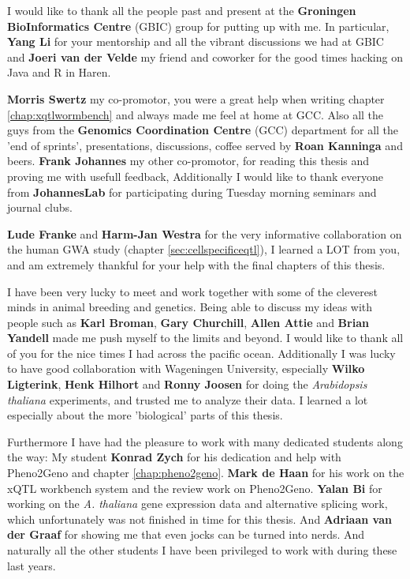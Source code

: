 I would like to thank all the people past and present at the {\bf Groningen BioInformatics Centre} 
(GBIC) group for putting up with me. In particular, {\bf Yang Li} for your mentorship and all the 
vibrant discussions we had at GBIC and {\bf Joeri van der Velde} my friend and coworker for the 
good times hacking on Java and R in Haren.

{\bf Morris Swertz} my co-promotor, you were a great help when writing chapter \ref{chap:xqtlwormbench} 
and always made me feel at home at GCC. Also all the guys from the {\bf Genomics Coordination 
Centre} (GCC) department for all the 'end of sprints', presentations, discussions, coffee served by {\bf Roan Kanninga} and beers. 
{\bf Frank Johannes} my other co-promotor, for reading this thesis and proving me with usefull feedback, 
Additionally I would like to thank everyone from {\bf JohannesLab} for participating during Tuesday morning 
seminars and journal clubs. 

{\bf Lude Franke} and {\bf Harm-Jan Westra} for the very informative collaboration on the 
human GWA study (chapter \ref{sec:cellspecificeqtl}), I learned a LOT from you, and am 
extremely thankful for your help with the final chapters of this thesis. 

I have been very lucky to meet and work together with some of the cleverest minds in animal breeding 
and genetics. Being able to discuss my ideas with people such as {\bf Karl Broman}, {\bf Gary Churchill}, 
{\bf Allen Attie} and {\bf Brian Yandell} made me push myself to the limits and beyond. I would like 
to thank all of you for the nice times I had across the pacific ocean. 
Additionally I was lucky to have good collaboration with Wageningen University, especially {\bf Wilko 
Ligterink}, {\bf Henk Hilhort} and {\bf Ronny Joosen} for doing the \emph{Arabidopsis thaliana} 
experiments, and trusted me to analyze their data. I learned a lot especially about the more 'biological' 
parts of this thesis. 

Furthermore I have had the pleasure to work with many dedicated students along the way: 
My student {\bf Konrad Zych} for his dedication and help with Pheno2Geno and chapter \ref{chap:pheno2geno}. 
{\bf Mark de Haan} for his work on the xQTL workbench system and the review work on Pheno2Geno.
{\bf Yalan Bi} for working on the \emph{A. thaliana} gene expression data and alternative splicing 
work, which unfortunately was not finished in time for this thesis. And {\bf Adriaan van der Graaf} for 
showing me that even jocks can be turned into nerds. And naturally all the other students I have been 
privileged to work with during these last years.

